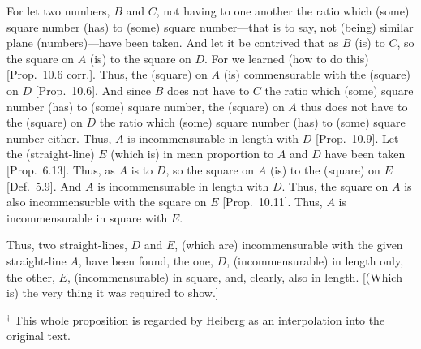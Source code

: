 \begin{Parallel}{}{}
{For let two numbers, $B$ and $C$,  not having to one another
the ratio which (some) square number (has) to (some) square number---that
is to say, not (being) similar plane (numbers)---have been taken. And let it be contrived
that as $B$ (is) to $C$, so the square on $A$ (is) to the square on $D$.
For we learned (how to do this) [Prop.~10.6 corr.].
Thus, the (square) on $A$ (is) commensurable with the (square) on $D$
[Prop.~10.6]. And since $B$ does not have to $C$ the
ratio which (some) square number (has) to (some) square number, the
(square) on $A$ thus does not have to the (square) on $D$ the ratio which (some) square number (has) to (some) square number either. Thus, $A$ is
incommensurable in length with $D$ [Prop.~10.9].
Let the (straight-line) $E$ (which is) in mean proportion to $A$ and $D$ have
been taken [Prop.~6.13]. Thus, as $A$ is to $D$, so the square on $A$ (is) to the (square)
on $E$ [Def.~5.9]. And $A$ is incommensurable in length with $D$. Thus, the square on $A$ is also incommensurble
with the square on $E$ [Prop.~10.11]. 
Thus, $A$ is incommensurable in square with $E$.

Thus, two straight-lines, $D$ and $E$, (which are) incommensurable with the given
straight-line $A$, have been found, the one, $D$, (incommensurable)
in length only, the other, $E$, (incommensurable) in square, and, clearly, also in length. [(Which is) the very thing it was required to show.]}
\end{Parallel}
{\footnotesize\noindent$^\dag$ This whole proposition is regarded by Heiberg as an interpolation into the original text.}

